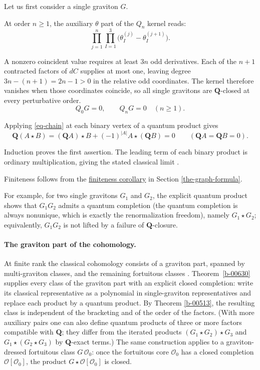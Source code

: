 \documentclass[11pt]{article}
\numberwithin{equation}{section}
\numberwithin{figure}{section}
\numberwithin{table}{section}
\begin{document}
Let us first consider a single graviton $G$.

At order $n\ge1$, the auxiliary $\theta$ part of the $Q_n$ kernel reads:
\begin{equation}\label{eq-graviton-odd-factor}
\prod_{j=1}^{n}\prod_{I=1}^{3}
\bigl(\theta_I^{(j)}-\theta_I^{(j+1)}\bigr).
\end{equation}

A nonzero coincident value requires at least $3n$ odd derivatives. Each of the $n+1$ contracted factors of $dC$ supplies at most one, leaving degree $3n-(n+1)=2n-1>0$ in the relative odd coordinates. The kernel therefore vanishes when those coordinates coincide, so all single gravitons are $\mathbf Q$-closed at every perturbative order.
\begin{equation}\label{eq-2-60}
Q_0G=0,\qquad Q_nG=0\quad(n\geq1).
\end{equation}

Applying \eqref{eq-chain} at each binary vertex of a quantum product gives
\begin{equation}\label{b-00642}
\mathbf Q(A\star B)
=(\mathbf QA)\star B+(-1)^{|A|}A\star(\mathbf QB)=0
\qquad(\mathbf QA=\mathbf QB=0).
\end{equation}

Induction proves the first assertion. The leading term of each binary product is ordinary multiplication, giving the stated classical limit \cite[Section 5]{ChangYin}.

Finiteness follows from the \hyperref[local-ch8-finite-product-corollary]{finiteness corollary} in Section \ref{the-graph-formula}.\hfill\qedsymbol

For example, for two single gravitons $G_1$ and $G_2$, the explicit quantum product shows that $G_1G_2$ admits a quantum completion (the quantum completion is always nonunique, which is exactly the renormalization freedom), namely $G_1\star G_2$; equivalently, $G_1G_2$ is not lifted by a failure of $\mathbf Q$-closure.

\paragraph{The graviton part of the cohomology.}\label{the-graviton-part-of-the-cohomology}

At finite rank the classical cohomology consists of a graviton part, spanned by multi-graviton classes, and the remaining fortuitous classes \cite{microstates}. Theorem~\ref{b-00630} supplies every class of the graviton part with an explicit closed completion: write its classical representative as a polynomial in single-graviton representatives and replace each product by a quantum product. By Theorem \ref{b-00513}, the resulting class is independent of the bracketing and of the order of the factors. (With more auxiliary pairs one can also define quantum products of three or more factors compatible with $\mathbf Q$; they differ from the iterated products $(G_1\star G_2)\star G_3$ and $G_1\star(G_2\star G_3)$ by $\mathbf Q$-exact terms.) The same construction applies to a graviton-dressed fortuitous class $G\,\mathcal O_0$: once the fortuitous core $\mathcal O_0$ has a closed completion $\mathcal O[\mathcal O_0]$, the product $G\star\mathcal O[\mathcal O_0]$ is closed.
\end{document}
